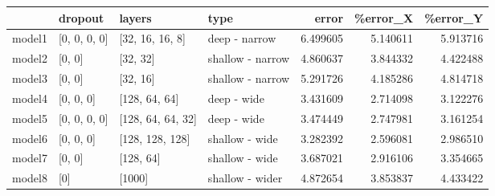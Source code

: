 \begin{tabular}{llllrrr}
\toprule
{} &       dropout &             layers &              type &     error &  \%error\_X &  \%error\_Y \\
\midrule
model1 &  [0, 0, 0, 0] &    [32, 16, 16, 8] &     deep - narrow &  6.499605 &  5.140611 &  5.913716 \\
model2 &        [0, 0] &           [32, 32] &  shallow - narrow &  4.860637 &  3.844332 &  4.422488 \\
model3 &        [0, 0] &           [32, 16] &  shallow - narrow &  5.291726 &  4.185286 &  4.814718 \\
model4 &     [0, 0, 0] &      [128, 64, 64] &       deep - wide &  3.431609 &  2.714098 &  3.122276 \\
model5 &  [0, 0, 0, 0] &  [128, 64, 64, 32] &       deep - wide &  3.474449 &  2.747981 &  3.161254 \\
model6 &     [0, 0, 0] &    [128, 128, 128] &    shallow - wide &  3.282392 &  2.596081 &  2.986510 \\
model7 &        [0, 0] &          [128, 64] &    shallow - wide &  3.687021 &  2.916106 &  3.354665 \\
model8 &           [0] &             [1000] &   shallow - wider &  4.872654 &  3.853837 &  4.433422 \\
\bottomrule
\end{tabular}
